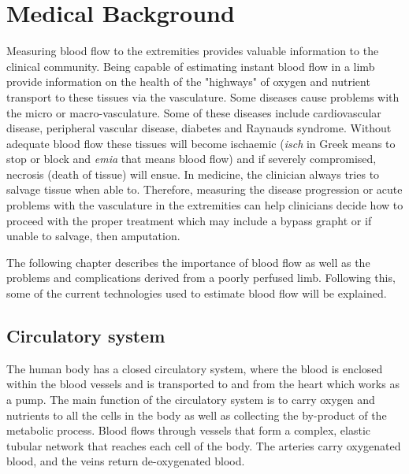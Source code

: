 
\chapter{Medical Background}
\label{chapter1}

\ifpdf
    \graphicspath{{Chapter2/Figs/Raster/}{Chapter2/Figs/PDF/}{Chapter2/Figs/}}
\else
    \graphicspath{{Chapter2/Figs/Vector/}{Chapter2/Figs/}}
\fi

Measuring blood flow to the extremities provides valuable information to the clinical community. Being capable of estimating instant blood flow in a limb provide information on the health of the "highways" of oxygen and nutrient transport to these tissues via the vasculature. Some diseases cause problems with the micro or macro-vasculature. Some of these diseases include cardiovascular disease, peripheral vascular disease, diabetes and Raynauds syndrome. Without adequate blood flow these tissues will become ischaemic (\textit{isch} in Greek means to stop or block and \textit{emia} that means blood flow) and if severely compromised, necrosis (death of tissue) will ensue. In medicine, the clinician always tries to salvage tissue when able to. Therefore, measuring the disease progression or acute problems with the vasculature in the extremities can help clinicians decide how to proceed with the proper treatment which may include a bypass grapht or if unable to salvage, then amputation.


The following chapter describes the importance of blood flow as well as the problems and complications derived from a poorly perfused limb. Following this, some of the current technologies used to estimate blood flow will be explained.  

\section{Circulatory system} %
\label{section literature 1}
The human body has a closed circulatory system, where the blood is enclosed within the blood vessels and is transported to and from the heart which works as a pump. The main function of the circulatory system is to carry oxygen and nutrients to all the cells in the body as well as collecting the by-product of the metabolic process. Blood flows through vessels that form a complex, elastic tubular network that reaches each cell of the body. The arteries carry oxygenated blood, and the veins return de-oxygenated blood. 

